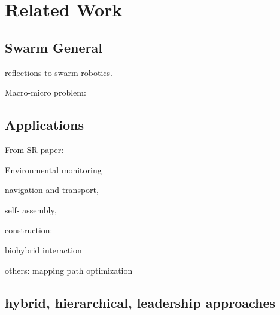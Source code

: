 \chapter{Related Work}
\label{ch2}


\section{Swarm General}

\cite{dorigo2020reflections} reflections to swarm robotics.

Macro-micro problem:

\cite{hamann2008framework}

\cite{hamann2010space}

\cite{hamann2018swarm}

\section{Applications}

From SR paper: 

\cite{talamali2021less} Environmental monitoring 

\cite{dorigo2013swarmanoid} navigation and transport,

\cite{rubenstein2014programmable} self- assembly,

construction:

\cite{team2012designing}
\cite{petersen2019review}

biohybrid interaction 
\cite{wahby2018autonomously}
\cite{halloy2007social}

others:
\cite{howard2006multi} mapping
\cite{psaraftis2016dynamic} path optimization

\section{hybrid, hierarchical, leadership approaches}

